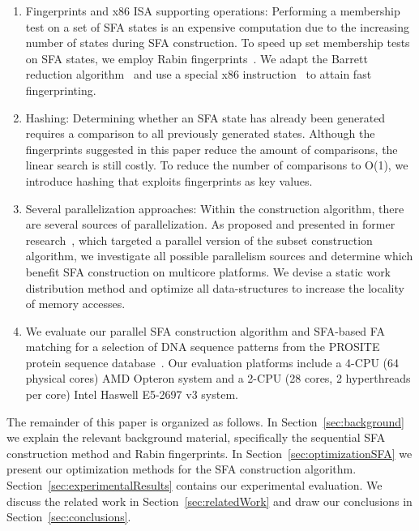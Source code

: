 \documentclass[10pt, conference, compsocconf]{IEEEtran}
\begin{document}
\begin{enumerate}
\item {Fingerprints and x86 ISA supporting operations:} Performing a membership
test on a set of SFA states is an expensive computation due to the increasing
number of states during SFA construction. To speed up set membership tests on
SFA states, we employ Rabin fingerprints~\cite{Broder93, Rabin81}.  We adapt
the Barrett reduction algorithm~\cite{Barrett87} and use a special x86
instruction~\cite{IntelCRC, AVX2} to attain fast fingerprinting.

\item{Hashing:}
Determining whether an SFA state has already been generated
requires a comparison to all previously generated states.
Although the fingerprints suggested in this paper reduce
the amount of comparisons, the linear search is still
costly.
To reduce the number of comparisons to O(1), we introduce
hashing that exploits fingerprints as key values.

\item {Several parallelization approaches:}
Within the construction algorithm, there are several sources
of parallelization.
As proposed and presented in former research~\cite{Choi2013},
which targeted a parallel version of the subset construction
algorithm, we
investigate all possible parallelism sources and determine which benefit
SFA construction on multicore platforms. 
We devise a static work distribution method and optimize all data-structures
to increase the locality of memory accesses.

\item
We evaluate our parallel SFA construction algorithm and SFA-based FA matching
for a selection of DNA sequence patterns from the PROSITE protein sequence
database~\cite{PROSITE,ScanProsite:2002}.  Our evaluation platforms include a
4-CPU (64 physical cores) AMD Opteron system and a 2-CPU (28 cores, 2
hyperthreads per core) Intel Haswell E5-2697 v3 system.
\end{enumerate}

The remainder of this paper is organized as follows.  In
Section~\ref{sec:background} we explain the relevant background material, specifically the
sequential SFA construction method and Rabin fingerprints.  In
Section~\ref{sec:optimizationSFA} we present our optimization methods for the
SFA construction algorithm.  Section~\ref{sec:experimentalResults} contains our
experimental evaluation. We discuss the related work in
Section~\ref{sec:relatedWork} and draw our conclusions in
Section~\ref{sec:conclusions}.
\end{document}
